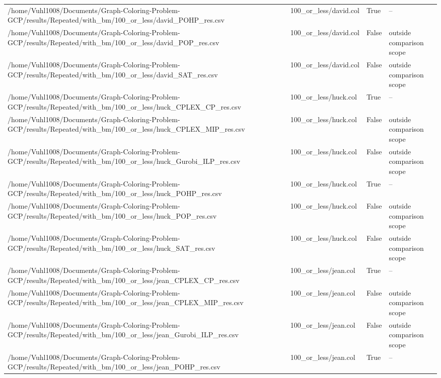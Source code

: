\begin{table}[htbp]
\begin{tabular}{llll}
/home/Vuhl1008/Documents/Graph-Coloring-Problem-GCP/results/Repeated/with\_bm/100\_or\_less/david\_POHP\_res.csv & 100\_or\_less/david.col & True & -- \\
/home/Vuhl1008/Documents/Graph-Coloring-Problem-GCP/results/Repeated/with\_bm/100\_or\_less/david\_POP\_res.csv & 100\_or\_less/david.col & False & outside comparison scope \\
/home/Vuhl1008/Documents/Graph-Coloring-Problem-GCP/results/Repeated/with\_bm/100\_or\_less/david\_SAT\_res.csv & 100\_or\_less/david.col & False & outside comparison scope \\
/home/Vuhl1008/Documents/Graph-Coloring-Problem-GCP/results/Repeated/with\_bm/100\_or\_less/huck\_CPLEX\_CP\_res.csv & 100\_or\_less/huck.col & True & -- \\
/home/Vuhl1008/Documents/Graph-Coloring-Problem-GCP/results/Repeated/with\_bm/100\_or\_less/huck\_CPLEX\_MIP\_res.csv & 100\_or\_less/huck.col & False & outside comparison scope \\
/home/Vuhl1008/Documents/Graph-Coloring-Problem-GCP/results/Repeated/with\_bm/100\_or\_less/huck\_Gurobi\_ILP\_res.csv & 100\_or\_less/huck.col & False & outside comparison scope \\
/home/Vuhl1008/Documents/Graph-Coloring-Problem-GCP/results/Repeated/with\_bm/100\_or\_less/huck\_POHP\_res.csv & 100\_or\_less/huck.col & True & -- \\
/home/Vuhl1008/Documents/Graph-Coloring-Problem-GCP/results/Repeated/with\_bm/100\_or\_less/huck\_POP\_res.csv & 100\_or\_less/huck.col & False & outside comparison scope \\
/home/Vuhl1008/Documents/Graph-Coloring-Problem-GCP/results/Repeated/with\_bm/100\_or\_less/huck\_SAT\_res.csv & 100\_or\_less/huck.col & False & outside comparison scope \\
/home/Vuhl1008/Documents/Graph-Coloring-Problem-GCP/results/Repeated/with\_bm/100\_or\_less/jean\_CPLEX\_CP\_res.csv & 100\_or\_less/jean.col & True & -- \\
/home/Vuhl1008/Documents/Graph-Coloring-Problem-GCP/results/Repeated/with\_bm/100\_or\_less/jean\_CPLEX\_MIP\_res.csv & 100\_or\_less/jean.col & False & outside comparison scope \\
/home/Vuhl1008/Documents/Graph-Coloring-Problem-GCP/results/Repeated/with\_bm/100\_or\_less/jean\_Gurobi\_ILP\_res.csv & 100\_or\_less/jean.col & False & outside comparison scope \\
/home/Vuhl1008/Documents/Graph-Coloring-Problem-GCP/results/Repeated/with\_bm/100\_or\_less/jean\_POHP\_res.csv & 100\_or\_less/jean.col & True & -- \\

\end{tabular}
\end{table}
